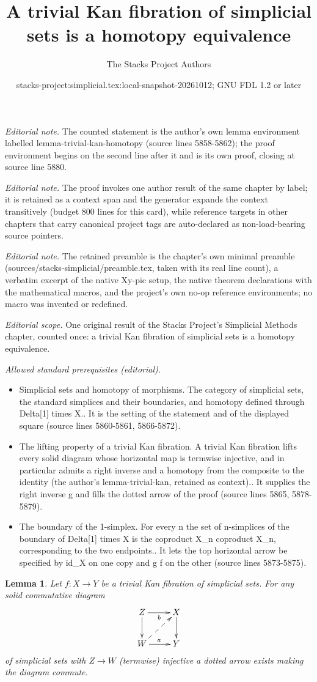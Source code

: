 \documentclass{stacks-project}
\title{A trivial Kan fibration of simplicial sets is a homotopy equivalence}
\author{The Stacks Project Authors}
\date{stacks-project:simplicial.tex:local-snapshot-20261012; GNU FDL 1.2 or later}
\theoremstyle{plain}
\newtheorem{lemma}[subsection]{Lemma}
\theoremstyle{definition}
\theoremstyle{remark}
\numberwithin{equation}{subsection}
\begin{document}
\maketitle
\noindent\textit{Editorial note.} The counted statement is the author's own lemma environment labelled lemma-trivial-kan-homotopy (source lines 5858-5862); the proof environment begins on the second line after it and is its own proof, closing at source line 5880.\par\medskip
\noindent\textit{Editorial note.} The proof invokes one author result of the same chapter by label; it is retained as a context span and the generator expands the context transitively (budget 800 lines for this card), while reference targets in other chapters that carry canonical project tags are auto-declared as non-load-bearing source pointers.\par\medskip
\noindent\textit{Editorial note.} The retained preamble is the chapter's own minimal preamble (sources/stacks-simplicial/preamble.tex, taken with its real line count), a verbatim excerpt of the native Xy-pic setup, the native theorem declarations with the mathematical macros, and the project's own no-op reference environments; no macro was invented or redefined.\par\medskip
\noindent\textit{Editorial scope.} One original result of the Stacks Project's Simplicial Methods chapter, counted once: a trivial Kan fibration of simplicial sets is a homotopy equivalence.\par\medskip
\noindent\textit{Allowed standard prerequisites (editorial).}\begin{itemize}
\item Simplicial sets and homotopy of morphisms. The category of simplicial sets, the standard simplices and their boundaries, and homotopy defined through Delta[1] times X.. It is the setting of the statement and of the displayed square (source lines 5860-5861, 5866-5872).
\item The lifting property of a trivial Kan fibration. A trivial Kan fibration lifts every solid diagram whose horizontal map is termwise injective, and in particular admits a right inverse and a homotopy from the composite to the identity (the author's lemma-trivial-kan, retained as context).. It supplies the right inverse g and fills the dotted arrow of the proof (source lines 5865, 5878-5879).
\item The boundary of the 1-simplex. For every n the set of n-simplices of the boundary of Delta[1] times X is the coproduct X\_n coproduct X\_n, corresponding to the two endpoints.. It lets the top horizontal arrow be specified by id\_X on one copy and g f on the other (source lines 5873-5875).
\end{itemize}\medskip
\begin{lemma}
\label{lemma-trivial-kan}
Let $f : X \to Y$ be a trivial Kan fibration of simplicial sets.
For any solid commutative diagram
$$
\xymatrix{
Z \ar[r]_b \ar[d] & X \ar[d] \\
W \ar[r]^a \ar@{-->}[ru] & Y
}
$$
of simplicial sets with $Z \to W$ (termwise) injective
a dotted arrow exists making the diagram commute.
\end{lemma}
\end{document}
